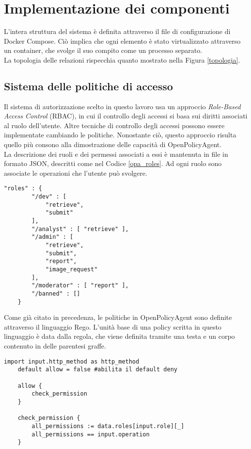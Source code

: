 \section{Implementazione dei componenti}
L'intera struttura del sistema è definita attraverso il file di configurazione di Docker Compose. Ciò implica che ogni 
elemento è stato virtualizzato attraverso un container, che svolge il suo compito come un processo separato. 
\\ La topologia delle relazioni rispecchia quanto mostrato nella Figura \ref*{topologia}. 


\subsection{Sistema delle politiche di accesso}
Il sistema di autorizzazione scelto in questo lavoro usa un approccio \textit{Role-Based Access Control} (RBAC), in cui il 
controllo degli accessi si basa sui diritti associati al ruolo dell'utente. 
Altre tecniche di controllo degli accessi possono essere implementate cambiando le politiche. Nonostante ciò, 
questo approccio risulta quello più consono alla dimostrazione delle capacità di OpenPolicyAgent.
\\ La descrizione dei ruoli e dei permessi associati a essi è mantenuta in file in formato JSON, descritti come nel Codice \ref*{opa_roles}.
Ad ogni ruolo sono associate le operazioni che l'utente può svolgere.
\lstset{language=nginx}
\begin{lstlisting}[caption={[Descrizione dei ruoli in JSON]Descrizione dei ruoli e dei relativi permessi in formato JSON.},captionpos=b,label=opa_roles]
    "roles" : {
        "/dev" : [
            "retrieve", 
            "submit"
        ],
        "/analyst" : [ "retrieve" ],
        "/admin" : [ 
            "retrieve", 
            "submit",
            "report",
            "image_request"
        ],
        "/moderator" : [ "report" ], 
        "/banned" : []
    }
\end{lstlisting}
Come già citato in precedenza, le politiche in OpenPolicyAgent sono definite attraverso il linguaggio Rego. L'unità base di una policy scritta in questo linguaggio è data 
dalla regola, che viene definita tramite una testa e un corpo contenuto in delle parentesi graffe. 
\begin{lstlisting}[caption={[Policy in linguaggio Rego]Policy in linguaggio Rego. Il simbolo ":=" indica un assegnamento di valore, mentre "==" permette di confrontare l'uguaglianza fra i valori delle due variabili. L'indice "\_" permette di considerare tutti i valori di una dimensione di un vettore.},captionpos=b,label=opa_policy]
    import input.http_method as http_method   
    default allow = false #abilita il default deny

    allow {
        check_permission
    }

    check_permission {
        all_permissions := data.roles[input.role][_]
        all_permissions == input.operation
    }
\end{lstlisting}
